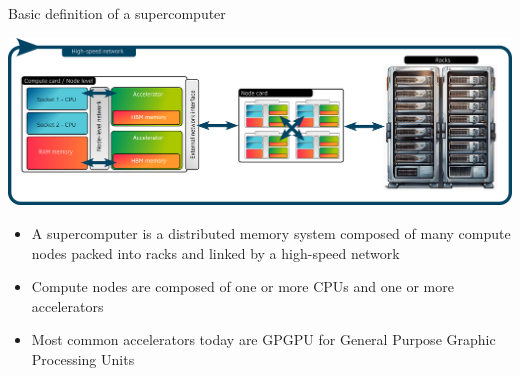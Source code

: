 \documentclass[aspectratio=169]{beamer}
\begin{document}
\begin{frame}{Basic definition of a supercomputer}
    \begin{center}
        \includegraphics[width=\textwidth]{super-computer_architecture.png}
    \end{center}
    \begin{itemize}
        \item A supercomputer is a distributed memory system composed of many compute nodes packed into racks and linked by a high-speed network
        \item Compute nodes are composed of one or more CPUs and one or more accelerators
        \item Most common accelerators today are GPGPU for General Purpose Graphic Processing Units
    \end{itemize}
\end{frame}

\end{document}
